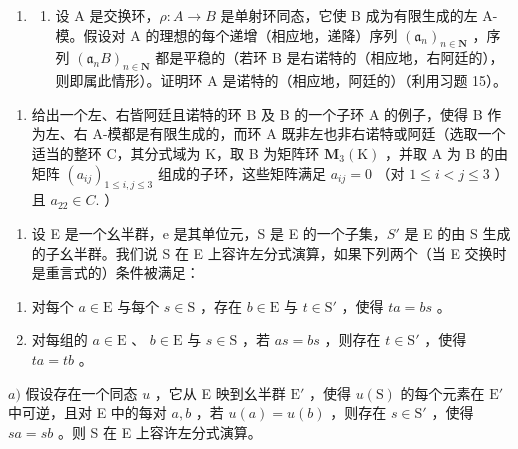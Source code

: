 \begin{enumerate}
\def\labelenumi{\arabic{enumi})}
\setcounter{enumi}{15}
\tightlist
\item
  \begin{enumerate}
  \def\labelenumii{\alph{enumii})}
  \tightlist
  \item
    设 A 是交换环，\(\rho: A \to B\) 是单射环同态，它使 B 成为有限生成的左 A-模。假设对 A 的理想的每个递增（相应地，递降）序列 \((\mathfrak{a}_{n})_{n \in \mathbf{N}}\) ，序列 \((\mathfrak{a}_{n}B)_{n \in \mathbf{N}}\) 都是平稳的（若环 B 是右诺特的（相应地，右阿廷的），则即属此情形）。证明环 A 是诺特的（相应地，阿廷的）（利用习题 15）。
  \end{enumerate}
\end{enumerate}

\begin{enumerate}
\def\labelenumi{\alph{enumi})}
\setcounter{enumi}{1}
\tightlist
\item
  给出一个左、右皆阿廷且诺特的环 B 及 B 的一个子环 A 的例子，使得 B 作为左、右 A-模都是有限生成的，而环 A 既非左也非右诺特或阿廷（选取一个适当的整环 C，其分式域为 K，取 B 为矩阵环 \(\mathbf{M}_{3}(\mathrm{K})\) ，并取 A 为 B 的由矩阵 \((a_{ij})_{1\leqslant i,j\leqslant3}\) 组成的子环，这些矩阵满足 \(a_{ij}=0\) （对 \(1\leqslant i<j\leqslant3\) ）且 \(a_{22}\in C.\) ）
\end{enumerate}

\begin{enumerate}
\def\labelenumi{\arabic{enumi})}
\setcounter{enumi}{16}
\tightlist
\item
  设 E 是一个幺半群，e 是其单位元，S 是 E 的一个子集，\(S'\) 是 E 的由 S 生成的子幺半群。我们说 S 在 E 上容许左分式演算，如果下列两个（当 E 交换时是重言式的）条件被满足：
\end{enumerate}

\begin{enumerate}
\def\labelenumi{(\roman{enumi})}
\item
  对每个 \(a \in \mathrm{E}\) 与每个 \(s \in \mathrm{S}\) ，存在 \(b \in \mathrm{E}\) 与 \(t \in \mathrm{S}'\) ，使得 \(ta = bs\) 。
\item
  对每组的 \(a \in \mathrm{E}\) 、 \(b \in \mathrm{E}\) 与 \(s \in \mathrm{S}\) ，若 \(as = bs\) ，则存在 \(t \in \mathrm{S}'\) ，使得 \(ta = tb\) 。
\end{enumerate}

\(a)\) 假设存在一个同态 \(u\) ，它从 E 映到幺半群 \(\mathrm{E}'\) ，使得 \(u(\mathrm{S})\) 的每个元素在 \(\mathrm{E}'\) 中可逆，且对 E 中的每对 \(a, b\) ，若 \(u(a) = u(b)\) ，则存在 \(s \in \mathrm{S}'\) ，使得 \(sa = sb\) 。则 S 在 E 上容许左分式演算。

